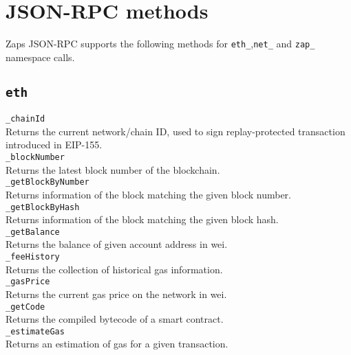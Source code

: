 \section{JSON-RPC methods}
\label{sec:rpc_methods}

Zaps JSON-RPC supports the following methods for \texttt{eth\_},\texttt{net\_} and \texttt{zap\_} namespace calls. \\

\subsection{\texttt{eth}}

\texttt{\_chainId}\\
Returns the current network/chain ID, used to sign replay-protected transaction introduced in EIP-155.\\

\texttt{\_blockNumber}\\
Returns the latest block number of the blockchain.\\

\texttt{\_getBlockByNumber}\\
Returns information of the block matching the given block number.\\

\texttt{\_getBlockByHash}\\
Returns information of the block matching the given block hash.\\

\texttt{\_getBalance}\\
Returns the balance of given account address in wei.\\

\texttt{\_feeHistory}\\
Returns the collection of historical gas information. \\

\texttt{\_gasPrice}\\
Returns the current gas price on the network in wei.\\

\texttt{\_getCode}\\
Returns the compiled bytecode of a smart contract. \\

\texttt{\_estimateGas}\\
Returns an estimation of gas for a given transaction. \\

